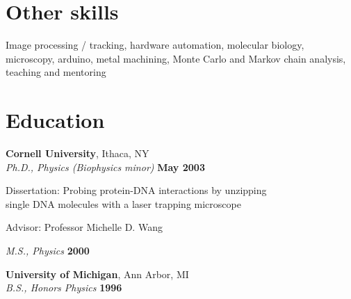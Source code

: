 \documentclass[margin,line]{resume}
\begin{document}
\begin{resume}
    \section{\mysidestyle Other skills} 

    Image processing / tracking, hardware automation, molecular biology, microscopy, arduino, metal machining, Monte Carlo and Markov chain analysis, teaching and mentoring  
 
 
    \section{\mysidestyle Education}

    \textbf{Cornell University}, Ithaca, NY \vspace{2mm}\\\vspace{1mm}%
    \textsl{Ph.D., Physics (Biophysics minor)} \hfill \textbf{ May 2003}\vspace{-3mm}\\\vspace{-1mm}%
    \begin{list2}
        \item Dissertation: Probing protein-DNA interactions by unzipping \\
        single DNA molecules with a laser trapping microscope
        \item Advisor:  Professor Michelle D. Wang
    \end{list2}\vspace{-1.5mm}

    \textsl{M.S., Physics} \hfill \textbf{2000}\\\vspace{0mm}%

    \textbf{University of Michigan}, Ann Arbor, MI \vspace{2mm}\\\vspace{1mm}%
    \textsl{B.S., Honors Physics} \hfill \textbf{1996}\vspace{-3mm}\\\vspace{-1mm}%
    

\end{resume}
\end{document}
